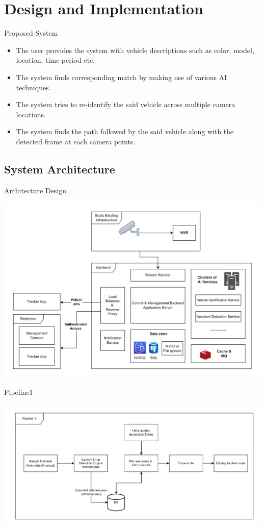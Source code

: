 \documentclass{beamer}
\begin{document}
	\section{Design and Implementation}
	\begin{frame}{Proposed System}
		\begin{itemize}
			\item The user provides the system with vehicle descriptions such as color, model, location, time-period etc. 
			\item The system finds corresponding match by making use of various AI techniques. 
			\item The system tries to re-identify the said vehicle across multiple camera locations.
			\item The system finds the path followed by the said vehicle
along with the detected frame at each camera points.
		\end{itemize}
	\end{frame}
	
	\subsection{System Architecture}
	\begin{frame}{Architecture Design}
		\begin{center}
			\includegraphics[width=\linewidth]{res/architecture_high_level}
		\end{center}
	\end{frame}

	\begin{frame}{Pipeline1}
		\begin{center}
			\includegraphics[width=\linewidth]{res/pipeline1}
		\end{center}
	\end{frame}
\end{document}
